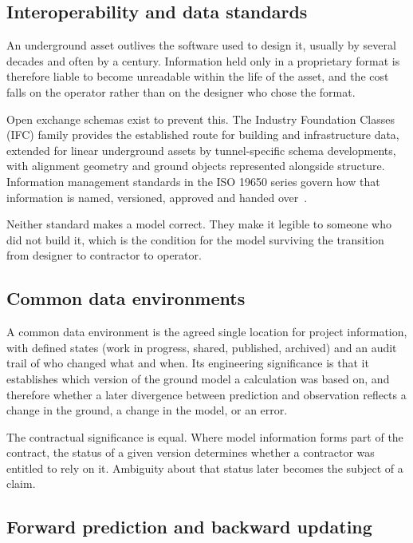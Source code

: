 \subsection{Interoperability and data standards}
\label{sec:data-standards}

An underground asset outlives the software used to design it, usually by
several decades and often by a century. Information held only in a proprietary
format is therefore liable to become unreadable within the life of the asset,
and the cost falls on the operator rather than on the designer who chose the format.

Open exchange schemas exist to prevent this. The Industry Foundation Classes
(IFC) family provides the established route for building and infrastructure
data, extended for linear underground assets by tunnel-specific schema
developments, with
alignment geometry and ground objects represented alongside structure.
Information management standards in the ISO 19650 series govern how that
information is named, versioned, approved and handed over~\citep{iso19650}.

Neither standard makes a model correct. They make it legible to
someone who did not build it, which is the condition for the model surviving
the transition from designer to contractor to operator.

\subsection{Common data environments}
\label{sec:cde}

A common data environment is the agreed single location for project
information, with defined states (work in progress, shared, published,
archived) and an audit trail of who changed what and when. Its engineering
significance is that it establishes which version of the ground model a
calculation was based on, and therefore whether a later divergence between
prediction and observation reflects a change in the ground, a change in the
model, or an error.

The contractual significance is equal. Where model information forms part of
the contract, the status of a given version determines whether a contractor
was entitled to rely on it. Ambiguity about that status later becomes the
subject of a claim.

\subsection{Forward prediction and backward updating}
\label{sec:forward-backward}

